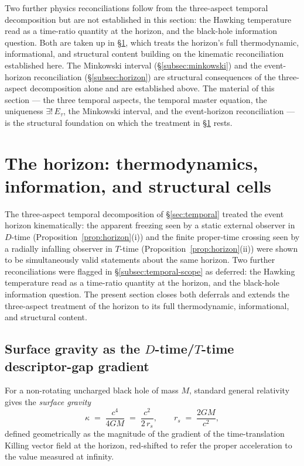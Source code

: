 \documentclass[11pt,a4paper]{article}
\theoremstyle{definition}
\theoremstyle{remark}
\begin{document}
Two further physics reconciliations follow from the three-aspect temporal decomposition but are not established in this section: the Hawking temperature read as a time-ratio quantity at the horizon, and the black-hole information question. Both are taken up in \S\ref{sec:horizon}, which treats the horizon's full thermodynamic, informational, and structural content building on the kinematic reconciliation established here. The Minkowski interval (\S\ref{subsec:minkowski}) and the event-horizon reconciliation (\S\ref{subsec:horizon}) are structural consequences of the three-aspect decomposition alone and are established above. The material of this section --- the three temporal aspects, the temporal master equation, the uniqueness $\exists!\,E_{\tau}$, the Minkowski interval, and the event-horizon reconciliation --- is the structural foundation on which the treatment in \S\ref{sec:horizon} rests.

\section{The horizon: thermodynamics, information, and structural cells}\label{sec:horizon}

The three-aspect temporal decomposition of \S\ref{sec:temporal} treated the event horizon kinematically: the apparent freezing seen by a static external observer in $D$-time (Proposition~\ref{prop:horizon}(i)) and the finite proper-time crossing seen by a radially infalling observer in $T$-time (Proposition~\ref{prop:horizon}(ii)) were shown to be simultaneously valid statements about the same horizon. Two further reconciliations were flagged in \S\ref{subsec:temporal-scope} as deferred: the Hawking temperature read as a time-ratio quantity at the horizon, and the black-hole information question. The present section closes both deferrals and extends the three-aspect treatment of the horizon to its full thermodynamic, informational, and structural content.

\subsection{Surface gravity as the $D$-time/$T$-time descriptor-gap gradient}\label{subsec:kappa-gradient}

For a non-rotating uncharged black hole of mass $M$, standard general relativity gives the \emph{surface gravity}
\begin{equation}\label{eq:kappa-GR}
\kappa \;=\; \frac{c^{4}}{4 G M} \;=\; \frac{c^{2}}{2\,r_{s}}, \qquad r_{s} \;=\; \frac{2GM}{c^{2}},
\end{equation}
defined geometrically as the magnitude of the gradient of the time-translation Killing vector field at the horizon, red-shifted to refer the proper acceleration to the value measured at infinity.
\end{document}
